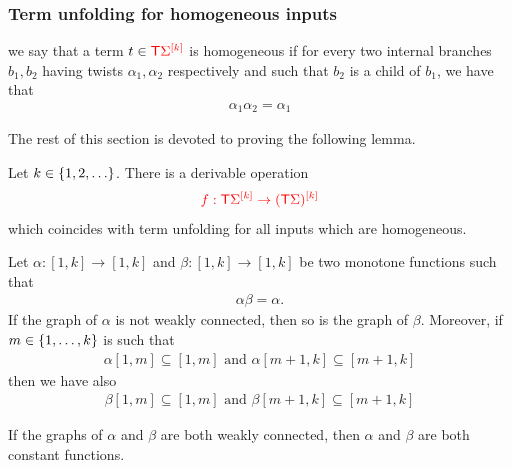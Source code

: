 \subsubsection{Term unfolding for homogeneous inputs}
\label{subsec:something-homo-unfold}
we say that a term $ t \in \tmonad \mati k \rSigma$ is homogeneous if for every two internal branches $b_1, b_2$ having twists $\alpha_1, \alpha_2$ respectively and such that $b_2$ is a child of $b_1$, we have that
\begin{align*}
\alpha_1\alpha_2=\alpha_1
\end{align*}

The rest of this section is devoted to proving the following lemma. 

\begin{lemma}\label{lem:homo-2-twist}
    Let $k \in \set{1,2,\ldots}$. There is a derivable operation 
    \begin{align*}
        \ranked{f : \tmonad \mati k \rSigma \to \mati k {(\tmonad \Sigma)} }
        \end{align*}      
which coincides with term unfolding for all inputs which are homogeneous.
\end{lemma}

\begin{lemma}\label{lem:decomp-twist-2}
Let $\alpha:[1,k]\to [1,k]$ and $\beta:[1,k]\to [1,k]$ be two monotone functions such that
\begin{align*}
\alpha\beta=\alpha.
\end{align*}
 If the graph of $\alpha$ is not weakly connected, then so is the graph of $\beta$. Moreover, if $m\in \set{1,\dots, k}$ is such that 
\begin{align*}
\alpha[1,m] \subseteq [1,m]  \text{ and } 
\alpha[m+1,k]\subseteq [m+1,k]
\end{align*}
then we have also 
\begin{align*}
\beta[1,m]\subseteq [1,m] \text{ and }
\beta[m+1,k]\subseteq [m+1,k]
\end{align*}

 If the graphs of $\alpha$ and $\beta$ are both weakly connected, then  $\alpha$ and  $\beta$ are both constant functions.
\end{lemma}

